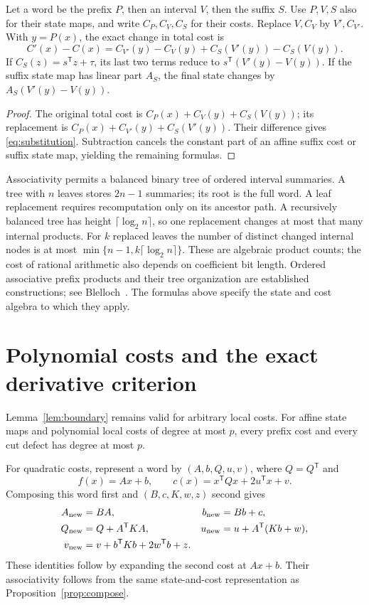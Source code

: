 \documentclass[11pt,a4paper]{article}
\theoremstyle{definition}\newtheorem{definition}[theorem]{Definition}\newtheorem{example}[theorem]{Example}\newtheorem{remark}[theorem]{Remark}
\begin{document}
\begin{proposition}\label{prop:substitution}
Let a word be the prefix $P$, then an interval $V$, then the suffix $S$.
Use $P,V,S$ also for their state maps, and write $C_P,C_V,C_S$ for
their costs. Replace $V,C_V$ by $V',C_{V'}$. With $y=P(x)$, the exact
change in total cost is
\begin{equation}\label{eq:substitution}
 C'(x)-C(x)=C_{V'}(y)-C_V(y)+C_S(V'(y))-C_S(V(y)).
\end{equation}
If $C_S(z)=s^{\mathsf T}z+\tau$, its last two terms reduce to
$s^{\mathsf T}(V'(y)-V(y))$.
If the suffix state map has linear part $A_S$, the final state changes by
$A_S(V'(y)-V(y))$.
\end{proposition}
\begin{proof}
The original total cost is $C_P(x)+C_V(y)+C_S(V(y))$; its replacement
is $C_P(x)+C_{V'}(y)+C_S(V'(y))$. Their difference gives
\eqref{eq:substitution}. Subtraction cancels the constant part of an
affine suffix cost or suffix state map, yielding the remaining formulas.
\end{proof}

Associativity permits a balanced binary tree of ordered interval
summaries. A tree with $n$ leaves stores $2n-1$ summaries; its root is
the full word. A leaf replacement requires recomputation only on its
ancestor path. A recursively balanced tree has height
$\lceil\log_2 n\rceil$, so one replacement changes at most that many
internal products. For $k$ replaced leaves the number of distinct
changed internal nodes is at most
$\min\{n-1,k\lceil\log_2 n\rceil\}$.
These are algebraic product counts; the cost of rational arithmetic
also depends on coefficient bit length. Ordered associative prefix
products and their tree organization are established constructions;
see Blelloch~\cite{blelloch}. The formulas above specify the state and
cost algebra to which they apply.

\section{Polynomial costs and the exact derivative criterion}
Lemma~\ref{lem:boundary} remains valid for arbitrary local costs.
For affine state maps and polynomial local costs of degree at most
$p$, every prefix cost and every cut defect has degree at most $p$.

For quadratic costs, represent a word by $(A,b,Q,u,v)$, where
$Q=Q^{\mathsf T}$ and
\[
 f(x)=Ax+b,\qquad c(x)=x^{\mathsf T}Qx+2u^{\mathsf T}x+v.
\]
Composing this word first and $(B,c,K,w,z)$ second gives
\begin{equation}\label{eq:quadraticproduct}
 \begin{aligned}
 A_{\rm new}&=BA,& b_{\rm new}&=Bb+c,\\
 Q_{\rm new}&=Q+A^{\mathsf T}KA,
 &u_{\rm new}&=u+A^{\mathsf T}(Kb+w),\\
 v_{\rm new}&=v+b^{\mathsf T}Kb+2w^{\mathsf T}b+z.
 \end{aligned}
\end{equation}
These identities follow by expanding the second cost at $Ax+b$.
Their associativity follows from the same state-and-cost
representation as Proposition~\ref{prop:compose}.
\end{document}
